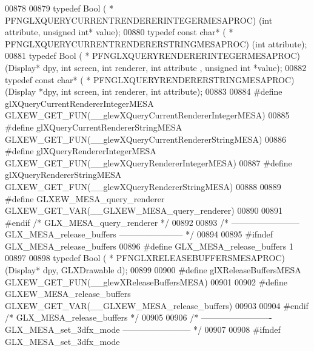 \begin{DoxyCode}
00878 
00879 \textcolor{keyword}{typedef} Bool ( * PFNGLXQUERYCURRENTRENDERERINTEGERMESAPROC) (\textcolor{keywordtype}{int} attribute, \textcolor{keywordtype}{unsigned} \textcolor{keywordtype}{int}* value);
00880 \textcolor{keyword}{typedef} \textcolor{keyword}{const} \textcolor{keywordtype}{char}* ( * PFNGLXQUERYCURRENTRENDERERSTRINGMESAPROC) (\textcolor{keywordtype}{int} attribute);
00881 \textcolor{keyword}{typedef} Bool ( * PFNGLXQUERYRENDERERINTEGERMESAPROC) (Display* dpy, \textcolor{keywordtype}{int} screen, \textcolor{keywordtype}{int} renderer, \textcolor{keywordtype}{int} attribute
      , \textcolor{keywordtype}{unsigned} \textcolor{keywordtype}{int} *value);
00882 \textcolor{keyword}{typedef} \textcolor{keyword}{const} \textcolor{keywordtype}{char}* ( * PFNGLXQUERYRENDERERSTRINGMESAPROC) (Display *dpy, \textcolor{keywordtype}{int} screen, \textcolor{keywordtype}{int} renderer, \textcolor{keywordtype}{int} 
      attribute);
00883 
00884 \textcolor{preprocessor}{#define glXQueryCurrentRendererIntegerMESA GLXEW\_GET\_FUN(\_\_glewXQueryCurrentRendererIntegerMESA)}
00885 \textcolor{preprocessor}{#define glXQueryCurrentRendererStringMESA GLXEW\_GET\_FUN(\_\_glewXQueryCurrentRendererStringMESA)}
00886 \textcolor{preprocessor}{#define glXQueryRendererIntegerMESA GLXEW\_GET\_FUN(\_\_glewXQueryRendererIntegerMESA)}
00887 \textcolor{preprocessor}{#define glXQueryRendererStringMESA GLXEW\_GET\_FUN(\_\_glewXQueryRendererStringMESA)}
00888 
00889 \textcolor{preprocessor}{#define GLXEW\_MESA\_query\_renderer GLXEW\_GET\_VAR(\_\_GLXEW\_MESA\_query\_renderer)}
00890 
00891 \textcolor{preprocessor}{#endif }\textcolor{comment}{/* GLX\_MESA\_query\_renderer */}\textcolor{preprocessor}{}
00892 
00893 \textcolor{comment}{/* ------------------------ GLX\_MESA\_release\_buffers ----------------------- */}
00894 
00895 \textcolor{preprocessor}{#ifndef GLX\_MESA\_release\_buffers}
00896 \textcolor{preprocessor}{#define GLX\_MESA\_release\_buffers 1}
00897 
00898 \textcolor{keyword}{typedef} Bool ( * PFNGLXRELEASEBUFFERSMESAPROC) (Display* dpy, GLXDrawable d);
00899 
00900 \textcolor{preprocessor}{#define glXReleaseBuffersMESA GLXEW\_GET\_FUN(\_\_glewXReleaseBuffersMESA)}
00901 
00902 \textcolor{preprocessor}{#define GLXEW\_MESA\_release\_buffers GLXEW\_GET\_VAR(\_\_GLXEW\_MESA\_release\_buffers)}
00903 
00904 \textcolor{preprocessor}{#endif }\textcolor{comment}{/* GLX\_MESA\_release\_buffers */}\textcolor{preprocessor}{}
00905 
00906 \textcolor{comment}{/* ------------------------- GLX\_MESA\_set\_3dfx\_mode ------------------------ */}
00907 
00908 \textcolor{preprocessor}{#ifndef GLX\_MESA\_set\_3dfx\_mode}

\end{DoxyCode}
